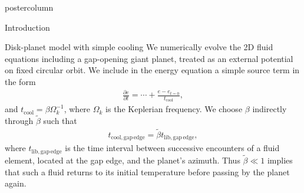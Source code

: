 \documentclass[final,hyperref={pdfpagelabels=false}]{beamer}
\newlength{\columnheight}
\begin{document}
\begin{frame}
\begin{columns}

    \begin{column}{.49\textwidth}
      \begin{beamercolorbox}[center,wd=\textwidth]{postercolumn}
        \begin{minipage}[T]{.95\textwidth}  %
          \parbox[t][\columnheight]{\textwidth}{ %
            \begin{block}{{\Large Introduction}}
              \justifying
                  {\large              
                    {\bf
                    }
                  }
            \end{block}
            \vfill
             
            \begin{block}{{\Large Disk-planet model with simple cooling}}
             We numerically evolve the 2D fluid equations including a gap-opening giant planet, treated as an external potential on fixed circular orbit. We include in the energy equation
        a simple source term in the form
	\begin{align*}
	\frac{\partial e}{\partial t} = \cdots + \frac{e-e_{t=0}}{t_\mathrm{cool}},
	\end{align*}
        and $t_\mathrm{cool} = \beta \Omega_k^{-1}$, where $\Omega_k$ is the Keplerian frequency. We choose $\beta$ indirectly 
        through $\tilde{\beta}$ such that
        \begin{align*}
        t_\mathrm{cool, gap\,edge} = \tilde{\beta} t_\mathrm{lib, gap\,edge},
        \end{align*}
        where $t_\mathrm{lib, gap\,edge}$ is the time interval between successive encounters of a fluid element, 
        located at the gap edge, and the planet's azimuth. Thus $\tilde{\beta}\ll 1$ implies that such a fluid returns to its initial temperature
        before passing by the planet again. 
        \end{block}
        \vfill

}
\end{minipage}
\end{beamercolorbox}
\end{column}
\end{columns}
\end{frame}
\end{document}
